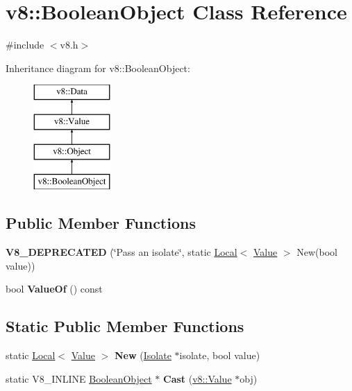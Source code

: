 \hypertarget{classv8_1_1_boolean_object}{}\section{v8\+:\+:Boolean\+Object Class Reference}
\label{classv8_1_1_boolean_object}


{\ttfamily \#include $<$v8.\+h$>$}

Inheritance diagram for v8\+:\+:Boolean\+Object\+:\begin{figure}[H]
\begin{center}
\leavevmode
\includegraphics[height=4.000000cm]{classv8_1_1_boolean_object}
\end{center}
\end{figure}
\subsection*{Public Member Functions}
\begin{DoxyCompactItemize}
\item 
{\bfseries V8\+\_\+\+D\+E\+P\+R\+E\+C\+A\+T\+ED} (\char`\"{}Pass an isolate\char`\"{}, static \hyperlink{classv8_1_1_local}{Local}$<$ \hyperlink{classv8_1_1_value}{Value} $>$ New(bool value))\hypertarget{classv8_1_1_boolean_object_ae13a7178a7ee05969b97fa5b0d22cd52}{}\label{classv8_1_1_boolean_object_ae13a7178a7ee05969b97fa5b0d22cd52}

\item 
bool {\bfseries Value\+Of} () const \hypertarget{classv8_1_1_boolean_object_a283419656e641bcd9588dee56c0a0686}{}\label{classv8_1_1_boolean_object_a283419656e641bcd9588dee56c0a0686}

\end{DoxyCompactItemize}
\subsection*{Static Public Member Functions}
\begin{DoxyCompactItemize}
\item 
static \hyperlink{classv8_1_1_local}{Local}$<$ \hyperlink{classv8_1_1_value}{Value} $>$ {\bfseries New} (\hyperlink{classv8_1_1_isolate}{Isolate} $\ast$isolate, bool value)\hypertarget{classv8_1_1_boolean_object_aaf29c0574a8366453ddb5a3d4f178ca4}{}\label{classv8_1_1_boolean_object_aaf29c0574a8366453ddb5a3d4f178ca4}

\item 
static V8\+\_\+\+I\+N\+L\+I\+NE \hyperlink{classv8_1_1_boolean_object}{Boolean\+Object} $\ast$ {\bfseries Cast} (\hyperlink{classv8_1_1_value}{v8\+::\+Value} $\ast$obj)\hypertarget{classv8_1_1_boolean_object_ac701398c9b1c74fbce31d66106c9a87f}{}\label{classv8_1_1_boolean_object_ac701398c9b1c74fbce31d66106c9a87f}

\end{DoxyCompactItemize}
